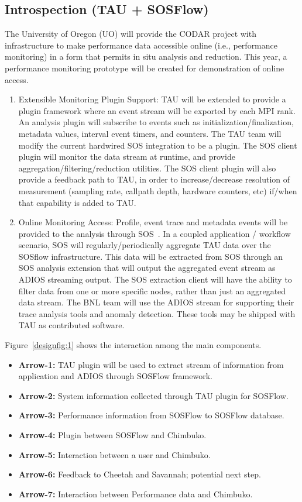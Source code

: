 \subsection{Introspection (TAU + SOSFlow)}
The University of Oregon (UO) will provide the CODAR project with infrastructure to make performance data accessible online (i.e., performance monitoring) in a form that permits in situ analysis and reduction. This year, a performance monitoring prototype will be created for demonstration of online access. 
\begin{enumerate}
\item Extensible Monitoring Plugin Support: TAU will be extended to provide a plugin framework where an event stream will be exported by each MPI rank. An analysis plugin will subscribe to events such as initialization/finalization, metadata values, interval event timers, and counters.  The TAU team will modify the current hardwired SOS integration to be a plugin. The SOS client plugin will monitor the data stream at runtime, and provide aggregation/filtering/reduction utilities.  The SOS client plugin will also provide a feedback path to TAU, in order to increase/decrease resolution of measurement (sampling rate, callpath depth, hardware counters, etc) if/when that capability is added to TAU.
\item Online Monitoring Access: Profile, event trace and metadata events will be provided to the analysis through SOS~\cite{Chad}. In a coupled application / workflow scenario, SOS will regularly/periodically aggregate TAU data over the SOSflow infrastructure.  This data will be extracted from SOS through an SOS analysis extension that will output the aggregated event stream as ADIOS streaming output.  The SOS extraction client will have the ability to filter data from one or more specific nodes, rather than just an aggregated data stream.  The  BNL team will use the ADIOS stream for supporting their trace analysis tools and anomaly detection. These tools may be shipped with TAU as contributed software.
\end{enumerate}

Figure~\ref{designfig:1} shows the interaction among the main components.

\begin{itemize}

\item {\bf{Arrow-1:}} TAU plugin will be used to extract stream of information from application and ADIOS through SOSFlow framework. 
\item {\bf{Arrow-2:}} System information collected through TAU plugin for SOSFlow.
\item {\bf{Arrow-3:}} Performance information from SOSFlow to SOSFlow database.
\item{\bf{ Arrow-4:}} Plugin between SOSFlow and Chimbuko.
\item {\bf{Arrow-5:}} Interaction between a user and Chimbuko.
\item {\bf{Arrow-6:}} Feedback to Cheetah and Savannah; potential next step.
\item {\bf{Arrow-7:}} Interaction between Performance data and Chimbuko.

\end{itemize}


